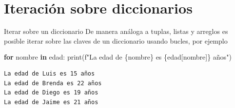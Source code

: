 \documentclass[
  ignorenonframetext,
  aspectratio=169,
  spanish,
]{beamer}
\newenvironment{Shaded}{\begin{snugshade}}{\end{snugshade}}
\newcommand{\BuiltInTok}[1]{\textcolor[rgb]{0.00,0.23,0.31}{#1}}
\newcommand{\ControlFlowTok}[1]{\textcolor[rgb]{0.00,0.23,0.31}{\textbf{#1}}}
\newcommand{\KeywordTok}[1]{\textcolor[rgb]{0.00,0.23,0.31}{\textbf{#1}}}
\newcommand{\NormalTok}[1]{\textcolor[rgb]{0.00,0.23,0.31}{#1}}
\newcommand{\SpecialCharTok}[1]{\textcolor[rgb]{0.37,0.37,0.37}{#1}}
\newcommand{\SpecialStringTok}[1]{\textcolor[rgb]{0.13,0.47,0.30}{#1}}
\begin{document}
\section{Iteración sobre
diccionarios}\label{iteraciuxf3n-sobre-diccionarios}

\begin{frame}[fragile]{Iterar sobre un diccionario}
\label{iterar-sobre-un-diccionario}
De manera análoga a tuplas, listas y arreglos es posible iterar sobre
las claves de un diccionario usando bucles, por ejemplo

\begin{Shaded}
\begin{Highlighting}[]
\ControlFlowTok{for}\NormalTok{ nombre }\KeywordTok{in}\NormalTok{ edad:}
  \BuiltInTok{print}\NormalTok{(}\SpecialStringTok{f"La edad de }\SpecialCharTok{\{}\NormalTok{nombre}\SpecialCharTok{\}}\SpecialStringTok{ es }\SpecialCharTok{\{}\NormalTok{edad[nombre]}\SpecialCharTok{\}}\SpecialStringTok{ años"}\NormalTok{)}
\end{Highlighting}
\end{Shaded}

\begin{verbatim}
La edad de Luis es 15 años
La edad de Brenda es 22 años
La edad de Diego es 19 años
La edad de Jaime es 21 años
\end{verbatim}
\end{frame}
\end{document}
